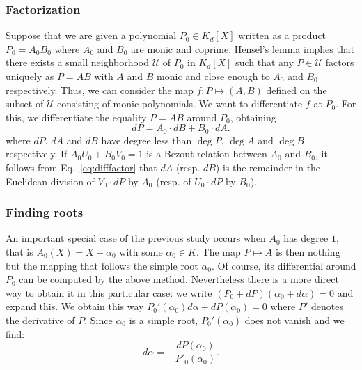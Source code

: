 \documentclass{lms}
\begin{document}
\subsubsection*{Factorization}

Suppose that we are given a polynomial $P_0 \in K_d[X]$ written as a 
product $P_0 = A_0 B_0$ where $A_0$ and $B_0$ are monic and coprime. 
Hensel's lemma implies that there exists a small neighborhood $\mathcal 
U$ of $P_0$ in $K_d[X]$ such that any $P \in \mathcal U$ factors 
uniquely as $P = A B$ with $A$ and $B$ monic and close enough to $A_0$ 
and $B_0$ respectively. Thus, we can consider the map $f : P 
\mapsto (A,B)$ defined on the subset of $\mathcal U$ consisting of monic 
polynomials. We want to differentiate $f$ at $P_0$. For this, we 
differentiate the equality $P = A B$ around $P_0$, obtaining
\begin{equation}
\label{eq:difffactor}
dP = A_0 \cdot dB + B_0 \cdot dA.
\end{equation}
where $dP$, $dA$ and $dB$ have degree less than $\deg P$, $\deg A$ and 
$\deg B$ respectively. If $A_0 U_0 + B_0 V_0 = 1$ is a Bezout relation
between $A_0$ and $B_0$, it follows from Eq.~\eqref{eq:difffactor} that
$dA$ (resp. $dB$) is the remainder in the Euclidean division of $V_0
{\cdot} dP$ by $A_0$ (resp. of $U_0 {\cdot} dP$ by $B_0$).

\subsubsection*{Finding roots}

An important special case of the previous study occurs when $A_0$ has 
degree $1$, that is $A_0(X) = X - \alpha_0$ with some $\alpha_0 \in K$. 
The map $P \mapsto A$ is then nothing but the mapping that 
follows the simple root $\alpha_0$. Of course, its differential around 
$P_0$ can be computed by the above method. Nevertheless there is a more 
direct way to obtain it in this particular case: we write $(P_0 + 
dP)(\alpha_0 + d\alpha) = 0$ and expand this. We obtain this way 
$P_0'(\alpha_0) d\alpha + dP(\alpha_0) = 0$ where $P'$ denotes the 
derivative of $P$. Since $\alpha_0$ is a simple root, $P_0'(\alpha_0)$ 
does not vanish and we find:
$$d \alpha = - \frac{dP(\alpha_0)}{P'_0(\alpha_0)}.$$
\end{document}
